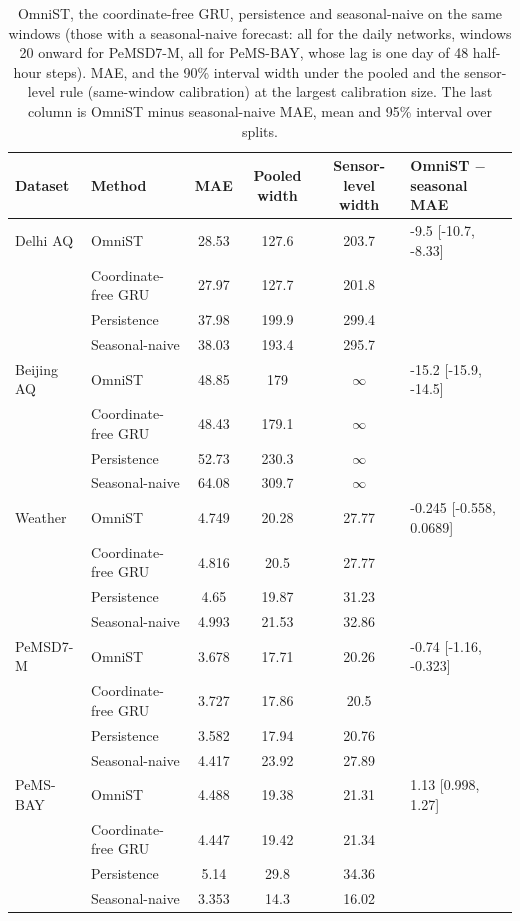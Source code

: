 \begin{table}[htbp]
\caption{OmniST, the coordinate-free GRU, persistence and seasonal-naive on the same windows (those with a seasonal-naive forecast: all for the daily networks, windows 20 onward for PeMSD7-M, all for PeMS-BAY, whose lag is one day of 48 half-hour steps). MAE, and the 90\% interval width under the pooled and the sensor-level rule (same-window calibration) at the largest calibration size. The last column is OmniST minus seasonal-naive MAE, mean and 95\% interval over splits.}
\label{tab:seasonalfull}
\centering\small
\begin{tabular}{llcccl}
\toprule
\textbf{Dataset} & \textbf{Method} & \textbf{MAE} & \textbf{Pooled width} & \textbf{Sensor-level width} & \textbf{OmniST $-$ seasonal MAE} \\
\midrule
Delhi AQ & OmniST & 28.53 & 127.6 & 203.7 & -9.5 [-10.7, -8.33] \\
 & Coordinate-free GRU & 27.97 & 127.7 & 201.8 &  \\
 & Persistence & 37.98 & 199.9 & 299.4 &  \\
 & Seasonal-naive & 38.03 & 193.4 & 295.7 &  \\
\midrule
Beijing AQ & OmniST & 48.85 & 179 & $\infty$ & -15.2 [-15.9, -14.5] \\
 & Coordinate-free GRU & 48.43 & 179.1 & $\infty$ &  \\
 & Persistence & 52.73 & 230.3 & $\infty$ &  \\
 & Seasonal-naive & 64.08 & 309.7 & $\infty$ &  \\
\midrule
Weather & OmniST & 4.749 & 20.28 & 27.77 & -0.245 [-0.558, 0.0689] \\
 & Coordinate-free GRU & 4.816 & 20.5 & 27.77 &  \\
 & Persistence & 4.65 & 19.87 & 31.23 &  \\
 & Seasonal-naive & 4.993 & 21.53 & 32.86 &  \\
\midrule
PeMSD7-M & OmniST & 3.678 & 17.71 & 20.26 & -0.74 [-1.16, -0.323] \\
 & Coordinate-free GRU & 3.727 & 17.86 & 20.5 &  \\
 & Persistence & 3.582 & 17.94 & 20.76 &  \\
 & Seasonal-naive & 4.417 & 23.92 & 27.89 &  \\
\midrule
PeMS-BAY & OmniST & 4.488 & 19.38 & 21.31 & 1.13 [0.998, 1.27] \\
 & Coordinate-free GRU & 4.447 & 19.42 & 21.34 &  \\
 & Persistence & 5.14 & 29.8 & 34.36 &  \\
 & Seasonal-naive & 3.353 & 14.3 & 16.02 &  \\
\bottomrule
\end{tabular}
\end{table}


